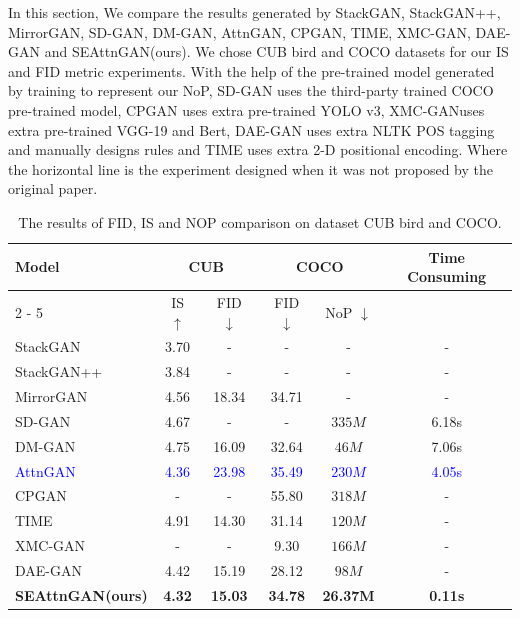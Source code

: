 \documentclass[runningheads, orivec]{llncs}
\begin{document}
In this section, We compare the results generated by StackGAN\cite{zhang2017stackgan}, StackGAN++\cite{zhang2018stackgan++}, MirrorGAN\cite{qiao2019mirrorgan}, SD-GAN\cite{yin2019semantics}, DM-GAN\cite{zhu2019dm}, AttnGAN\cite{xu2018attngan}, CPGAN\cite{liang2020cpgan}, TIME\cite{DBLP:conf/aaai/LiuSZME21}, XMC-GAN\cite{zhang2021cross}, DAE-GAN\cite{ruan2021dae} and SEAttnGAN(ours). We chose CUB bird\cite{WahCUB_200_2011} and COCO datasets\cite{lin2014microsoft} for our IS and FID metric experiments. With the help of the pre-trained model generated by training to represent our NoP, SD-GAN\cite{yin2019semantics}  uses the third-party trained COCO pre-trained model\cite{rombach2021highresolution}, CPGAN\cite{liang2020cpgan}  uses extra pre-trained YOLO v3\cite{farhadi2018yolov3}, XMC-GAN\cite{zhang2021cross}uses extra pre-trained VGG-19\cite{simonyan2014very} and Bert\cite{devlin2018bert},  DAE-GAN uses extra NLTK POS tagging and manually designs rules and TIME uses extra 2-D positional encoding. Where the horizontal line is the experiment designed when it was not proposed by the original paper.
\begin{table}[htbp]
        \caption{The results of FID, IS and NOP comparison on dataset CUB bird and COCO.}
	\begin{center}
	    \begin{tabular}{l|c|c|c|c|c}
		\hline {Model}  & \multicolumn{2}{|c|}{ CUB } & \multicolumn{2}{|c|}{ COCO } & \multicolumn{1}{|c}{Time Consuming}\\
		\cline { 2 - 5 } & IS $\uparrow$ & FID $\downarrow$ & FID $\downarrow$ & NoP $\downarrow$ \\
		\hline StackGAN\cite{zhang2017stackgan}  & 3.70 & - & - & - & - \\
		StackGAN++\cite{zhang2018stackgan++}& 3.84 & - & - & - & -\\
		MirrorGAN\cite{qiao2019mirrorgan}  & 4.56 & 18.34 & 34.71 & - & - \\
		SD-GAN\cite{yin2019semantics}  & 4.67 & - & - & $335 M$\cite{rombach2021highresolution} & 6.18s\\
		DM-GAN\cite{zhu2019dm}  & 4.75 & 16.09 & 32.64 & $46 M$ & 7.06s\\
		\textcolor{blue}{AttnGAN}\cite{xu2018attngan} & \textcolor{blue}{4.36} & \textcolor{blue}{23.98} & \textcolor{blue}{35.49} & \textcolor{blue}{$230M$} & \textcolor{blue}{4.05s}\\
		\hline CPGAN\cite{liang2020cpgan}  & - & - & 55.80 & $318 M$ & -\\
		TIME\cite{DBLP:conf/aaai/LiuSZME21} & 4.91 & 14.30 & 31.14 & $120 M$ & -\\
		XMC-GAN\cite{zhang2021cross} & - & - & 9.30 & $166 M$ & -\\
		DAE-GAN\cite{ruan2021dae}  & 4.42 & 15.19 & 28.12 & $98 M$ & -\\
		\hline \textbf{SEAttnGAN(ours)} & \textbf{4.32} & \textbf{15.03} & \textbf{34.78} & \textbf{26.37M} & \textbf{0.11s} \\
		\hline
	    \end{tabular}
            \vspace{-20pt}
	\end{center}
    \label{tab1}
\end{table}
\end{document}
